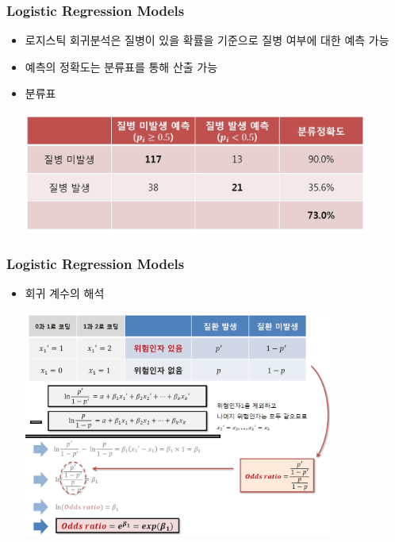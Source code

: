 \documentclass[10pt,xcolor={svgnames},t]{beamer}
\begin{document}
%
\begin{frame}
	\frametitle{Logistic Regression Models}
	
	\begin{itemize}
		\item 로지스틱 회귀분석은 질병이 있을 확률을 기준으로 질병 여부에 대한 예측 가능
		\bigskip
		\item 예측의 정확도는 분류표를 통해 산출 가능
		\bigskip
		\item 분류표
		\begin{center}
			\includegraphics[width=0.9\textwidth]{lo6.jpg}
		\end{center}
		
	\end{itemize}

	
\end{frame}
%
%
\begin{frame}
	\frametitle{Logistic Regression Models}
	
	\begin{itemize}
		\item 회귀 계수의 해석
				\begin{center}
					\includegraphics[width=0.8\textwidth]{lo7.jpg}
				\end{center}
	\end{itemize}
	
	
\end{frame}
\end{document}
